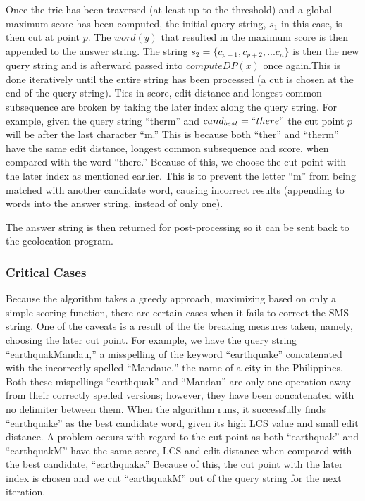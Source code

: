 \documentclass{acm_proc_article-sp}
\begin{document}
Once the trie has been traversed (at least up to the threshold) and a global maximum score has been computed, the initial query string, $s_1$ in this case, is then cut at point $p$. The $word(y)$ that resulted in the maximum score is then appended to the answer string. The string $s_2 = \{c_{p+1}, c_{p+2}, ... c_n\}$ is then the new query string and is afterward passed into $computeDP(x)$ once again.This is done iteratively until the entire string has been processed (a cut is chosen at the end of the query string). Ties in score, edit distance and longest common subsequence are broken by taking the later index along the query string. For example, given the query string ``therm'' and $cand_{best} = ``there"$ the cut point $p$ will be after the last character ``m.'' This is because both ``ther'' and ``therm'' have the same edit distance, longest common subsequence and score, when compared with the word ``there.'' Because of this, we choose the cut point with the later index as mentioned earlier. This is to prevent the letter ``m'' from being matched with another candidate word, causing incorrect results (appending to words into the answer string, instead of only one). 

The answer string is then returned for post-processing so it can be sent back to the geolocation program. 



\subsubsection{Critical Cases} 
Because the algorithm takes a greedy approach, maximizing based on only a simple scoring function, there are certain cases when it fails to correct the SMS string. One of the caveats is a result of the tie breaking measures taken, namely, choosing the later cut point. For example, we have the query string ``earthquakMandau,'' a misspelling of the keyword ``earthquake'' concatenated with the incorrectly spelled ``Mandaue,'' the name of a city in the Philippines. Both these mispellings ``earthquak'' and ``Mandau'' are only one operation away from their correctly spelled versions; however, they have been concatenated with no delimiter between them. When the algorithm runs, it successfully finds ``earthquake'' as the best candidate word, given its high LCS value and small edit distance. A problem occurs with regard to the cut point as both ``earthquak'' and ``earthquakM'' have the same score, LCS and edit distance when compared with the best candidate, ``earthquake.'' Because of this, the cut point with the later index is chosen and we cut ``earthquakM'' out of the query string for the next iteration. 
\end{document}
